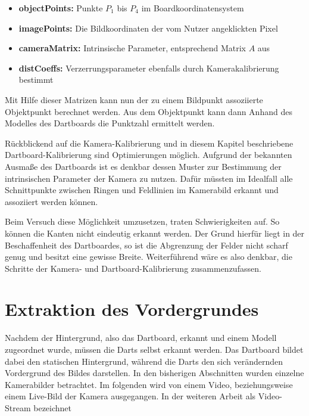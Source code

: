 \begin{itemize}
\item \textbf{objectPoints:} Punkte $P_1$ bis $P_4$ im Boardkoordinatensystem
\item \textbf{imagePoints:} Die Bildkoordinaten der vom Nutzer angeklickten Pixel
\item \textbf{cameraMatrix:} Intrinsische Parameter, entsprechend Matrix $A$ aus 
\item \textbf{distCoeffs:} Verzerrungsparameter ebenfalls durch Kamerakalibrierung bestimmt 
\end{itemize}
Mit Hilfe dieser Matrizen kann nun der zu einem Bildpunkt assoziierte Objektpunkt berechnet werden. Aus dem Objektpunkt kann dann Anhand des Modelles des Dartboards die Punktzahl ermittelt werden. 

Rückblickend auf die Kamera-Kalibrierung und in diesem Kapitel beschriebene Dartboard-Kalibrierung sind Optimierungen möglich. Aufgrund der bekannten Ausmaße des Dartboards ist es denkbar dessen Muster zur Bestimmung der intrinsischen Parameter der Kamera  zu nutzen. Dafür müssten im Idealfall alle Schnittpunkte zwischen Ringen und Feldlinien im Kamerabild erkannt und assoziiert werden können. 

Beim Versuch diese Möglichkeit umzusetzen, traten Schwierigkeiten auf. So können die Kanten nicht eindeutig erkannt werden.
Der Grund hierfür liegt in der Beschaffenheit des Dartboardes, so ist die Abgrenzung der Felder nicht scharf genug und besitzt eine gewisse Breite. Weiterführend wäre es also denkbar, die Schritte der Kamera- und Dartboard-Kalibrierung zusammenzufassen. 


\section{Extraktion des Vordergrundes}
\label{sec:substraction}
Nachdem der Hintergrund, also das Dartboard, erkannt und einem Modell zugeordnet wurde, müssen die Darts selbst erkannt werden. Das Dartboard bildet dabei den statischen Hintergrund, während die Darts den sich verändernden Vordergrund des Bildes darstellen. 
In den bisherigen Abschnitten wurden einzelne Kamerabilder betrachtet. Im folgenden wird von einem Video, beziehungsweise einem Live-Bild der Kamera ausgegangen. In der weiteren Arbeit als Video-Stream bezeichnet

